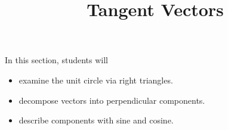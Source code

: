 \documentclass{ximera}
\title{Tangent Vectors}
\begin{document}
\begin{abstract}
\end{abstract}
\maketitle





\begin{sectionOutcomes}
In this section, students will 

\begin{itemize}
\item examine the unit circle via right triangles.
\item decompose vectors into perpendicular components.
\item describe components with sine and cosine.
\end{itemize}
\end{sectionOutcomes}
\end{document}
